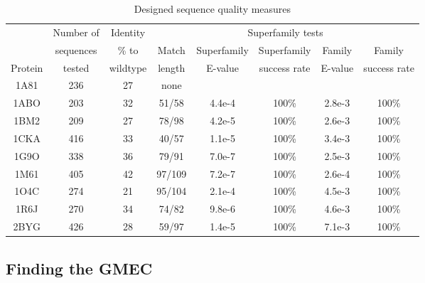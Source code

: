 {{\begin{table}[!htbp]                            
\caption{Designed sequence quality measures}
\small
\label{tab:quality}                      
\begin{center}
\begin{tabular}{cccccccc} \hline \hline  
        & Number of & Identity & \multicolumn{5}{c}{\hrulefill Superfamily tests \hrulefill}   \\
        & sequences & \% to    & Match & Superfamily & Superfamily  & Family  & Family        \\
Protein & tested    & wildtype & length & E-value     & success rate & E-value & success rate  \\ \hline
1A81    & 236       & 27       & none   &             &              &         &               \\
1ABO    & 203       & 32       & 51/58  & 4.4e-4      & 100\%        & 2.8e-3  & 100\%         \\
1BM2    & 209       & 27       & 78/98  & 4.2e-5      & 100\%        & 2.6e-3  & 100\%         \\
1CKA    & 416       & 33       & 40/57  & 1.1e-5      & 100\%        & 3.4e-3  & 100\%         \\
1G9O    & 338       & 36       & 79/91  & 7.0e-7      & 100\%        & 2.5e-3  & 100\%         \\
1M61    & 405       & 42       & 97/109 & 7.2e-7      & 100\%        & 2.6e-4  & 100\%         \\
1O4C    & 274       & 21       & 95/104 & 2.1e-4      & 100\%        & 4.5e-3  & 100\%         \\
1R6J    & 270       & 34       & 74/82  & 9.8e-6      & 100\%        & 4.6e-3  & 100\%         \\
2BYG    & 426       & 28       & 59/97  & 1.4e-5      & 100\%        & 7.1e-3  & 100\%         \\ \hline
\end{tabular}
\end{center}
\end{table}



\subsection{Finding the GMEC}
}}
